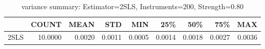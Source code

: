 \begin{table}[ht]
\centering
\caption{variance summary: Estimator=2SLS, Instruments=200, Strength=0.80}
\begin{tabular}{lrrrrrrrr}
\toprule
 & COUNT & MEAN & STD & MIN & 25\% & 50\% & 75\% & MAX \\
\midrule
2SLS & 10.0000 & 0.0020 & 0.0011 & 0.0005 & 0.0014 & 0.0018 & 0.0027 & 0.0036 \\
\bottomrule
\end{tabular}
\end{table}
